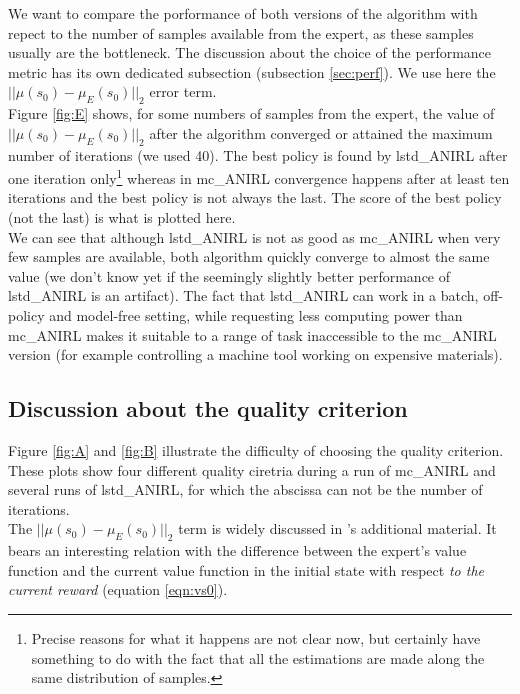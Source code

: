 \documentclass{article}
\begin{document}
We want to compare the porformance of both versions of the algorithm with repect to the number of samples available from the expert, as these samples usually are the bottleneck. The discussion about the choice of the performance metric has its own dedicated subsection (subsection \ref{sec:perf}). We use here the $||\mu(s_0) - \mu_E(s_0)||_2$ error term.\\

Figure \ref{fig:E} shows, for some numbers of samples from the expert, the value of $||\mu(s_0)-\mu_E(s_0)||_2$ after the algorithm converged or attained the maximum number of iterations (we used 40). The best policy is found by lstd\_ANIRL after one iteration only\footnote{Precise reasons for what it happens are not clear now, but certainly have something to do with the fact that all the estimations are made along the same distribution of samples.} whereas in mc\_ANIRL convergence happens after at least ten iterations and the best policy is not always the last. The score of the best policy (not the last) is what is plotted here.\\

We can see that although lstd\_ANIRL is not as good as mc\_ANIRL when very few samples are available, both algorithm quickly converge to almost the same value (we don't know yet if the seemingly slightly better performance of lstd\_ANIRL is an artifact). The fact that lstd\_ANIRL can work in a batch, off-policy and model-free setting, while requesting less computing power than mc\_ANIRL makes it suitable to a range of task inaccessible to the mc\_ANIRL version (for example controlling a machine tool working on expensive materials).
\subsection{Discussion about the quality criterion}
Figure \ref{fig:A} and \ref{fig:B} illustrate the difficulty of choosing the quality criterion. These plots show four different quality ciretria during a run of mc\_ANIRL and several runs of lstd\_ANIRL, for which the abscissa can not be the number of iterations.\\

The $||\mu(s_0) - \mu_E(s_0)||_2$ term is widely discussed in \citep{abbeel2004apprenticeship}'s additional material. It bears an interesting relation with the difference between the expert's value function and the current value function in the initial state with respect \emph{to the current reward} (equation \ref{eqn:vs0}).\\
\end{document}
